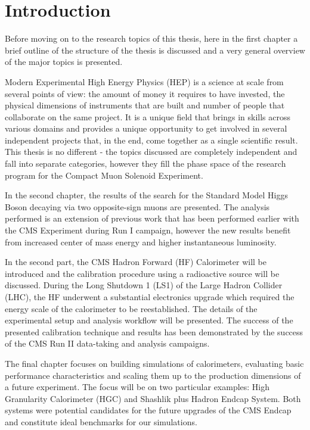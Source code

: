 \chapter{Introduction} \label{chapter:introduction}
Before moving on to the research topics of this thesis, here in the first chapter a brief outline of the structure of the thesis is discussed and a very general overview of the major topics is presented.

Modern Experimental High Energy Physics (HEP) is a science at scale from several points of view: the amount of money it requires to have invested, the physical dimensions of instruments that are built and number of people that collaborate on the same project. It is a unique field that brings in skills across various domains and provides a unique opportunity to get involved in several independent projects that, in the end, come together as a single scientific result. This thesis is no different - the topics discussed are completely independent and fall into separate categories, however they fill the phase space of the research program for the Compact Muon Solenoid Experiment.

In the second chapter, the results of the search for the Standard Model Higgs Boson decaying via two opposite-sign muons are presented. The analysis performed is an extension of previous work that has been performed earlier with the CMS Experiment during Run I campaign, however the new results benefit from increased center of mass energy and higher instantaneous luminosity.

In the second part, the CMS Hadron Forward (HF) Calorimeter will be introduced and the calibration procedure using a radioactive source will be discussed. During the Long Shutdown 1 (LS1) of the Large Hadron Collider (LHC), the HF underwent a substantial electronics upgrade which required the energy scale of the calorimeter to be reestablished. The details of the experimental setup and analysis workflow will be presented. The success of the presented calibration technique and results has been demonstrated by the success of the CMS Run II data-taking and analysis campaigns.

The final chapter focuses on building simulations of calorimeters, evaluating basic performance characteristics and scaling them up to the production dimensions of a future experiment. The focus will be on two particular examples: High Granularity Calorimeter (HGC) and Shashlik plus Hadron Endcap System. Both systems were potential candidates for the future upgrades of the CMS Endcap and constitute ideal benchmarks for our simulations.

